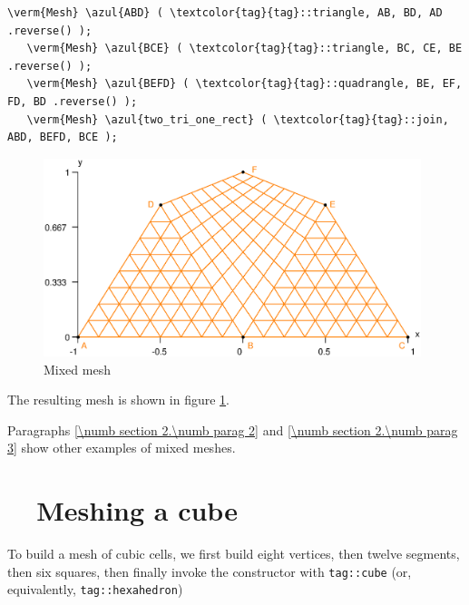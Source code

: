\begin{Verbatim}[commandchars=\\\{\},formatcom=\small\tt,frame=single,
   label=parag-\ref{\numb section 1.\numb parag 6}.cpp,rulecolor=\color{moldura},
   baselinestretch=0.94,framesep=2mm]
   \verm{Mesh} \azul{ABD} ( \textcolor{tag}{tag}::triangle, AB, BD, AD .reverse() );
   \verm{Mesh} \azul{BCE} ( \textcolor{tag}{tag}::triangle, BC, CE, BE .reverse() );
   \verm{Mesh} \azul{BEFD} ( \textcolor{tag}{tag}::quadrangle, BE, EF, FD, BD .reverse() );
   \verm{Mesh} \azul{two_tri_one_rect} ( \textcolor{tag}{tag}::join, ABD, BEFD, BCE );
\end{Verbatim}

\begin{figure}[ht] \centering
  \includegraphics[width=110mm]{two-tri-one-rect}
  \caption{Mixed mesh}
  \label{\numb section 1.\numb fig 8}
\end{figure}

The resulting mesh is shown in figure \ref{\numb section 1.\numb fig 8}.

Paragraphs \ref{\numb section 2.\numb parag 2} and \ref{\numb section 2.\numb parag 3}
show other examples of mixed meshes.


\section{~~Meshing a cube}\label{\numb section 1.\numb parag 7}

To build a mesh of cubic cells, we first build eight vertices, then twelve segments,
then six squares, then finally invoke the {\small\tt{}} constructor with
{\small\tt\textcolor{tag}{tag}::cube} (or, equivalently,
{\small\tt\textcolor{tag}{tag}::hexahedron})

